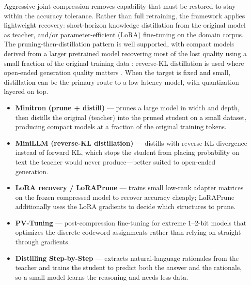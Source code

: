 Aggressive joint compression removes capability that must be restored to stay within the accuracy tolerance. Rather than full retraining, the framework applies lightweight recovery: short-horizon knowledge distillation from the original model as teacher, and/or parameter-efficient (LoRA) fine-tuning on the domain corpus. The pruning-then-distillation pattern is well supported, with compact models derived from a larger pretrained model recovering most of the lost quality using a small fraction of the original training data \cite{muralidharan2024minitron}; reverse-KL distillation is used where open-ended generation quality matters \cite{gu2024minillm}. When the target is fixed and small, distillation can be the primary route to a low-latency model, with quantization layered on top.

\begin{itemize}

  \item \textbf{Minitron (prune + distill)} \cite{muralidharan2024minitron} --- prunes a large model in width and depth, then distills the original (teacher) into the pruned student on a small dataset, producing compact models at a fraction of the original training tokens.

  \item \textbf{MiniLLM (reverse-KL distillation)} \cite{gu2024minillm} --- distills with reverse KL divergence instead of forward KL, which stops the student from placing probability on text the teacher would never produce---better suited to open-ended generation.

  \item \textbf{LoRA recovery / LoRAPrune} \cite{ma2023llmpruner,zhang2024loraprune} --- trains small low-rank adapter matrices on the frozen compressed model to recover accuracy cheaply; LoRAPrune additionally uses the LoRA gradients to decide which structures to prune.

  \item \textbf{PV-Tuning} \cite{malinovskii2024pvtuning} --- post-compression fine-tuning for extreme 1--2-bit models that optimizes the discrete codeword assignments rather than relying on straight-through gradients.

  \item \textbf{Distilling Step-by-Step} \cite{hsieh2023distilling} --- extracts natural-language rationales from the teacher and trains the student to predict both the answer and the rationale, so a small model learns the reasoning and needs less data.

\end{itemize}

